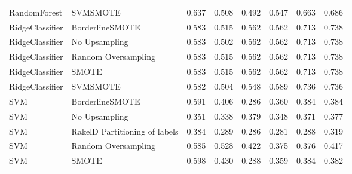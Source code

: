 \begin{tabular}{llllllll}
                   RandomForest &                      SVMSMOTE & 0.637 &                     0.508 &                 0.492 &                  0.547 &                                   0.663 &     0.686 \\
                RidgeClassifier &               BorderlineSMOTE & 0.583 &                     0.515 &                 0.562 &                  0.562 &                                   0.713 &     0.738 \\
                RidgeClassifier &                 No Upsampling & 0.583 &                     0.502 &                 0.562 &                  0.562 &                                   0.713 &     0.738 \\
                RidgeClassifier &           Random Oversampling & 0.583 &                     0.515 &                 0.562 &                  0.562 &                                   0.713 &     0.738 \\
                RidgeClassifier &                         SMOTE & 0.583 &                     0.515 &                 0.562 &                  0.562 &                                   0.713 &     0.738 \\
                RidgeClassifier &                      SVMSMOTE & 0.582 &                     0.504 &                 0.548 &                  0.589 &                                   0.736 &     0.736 \\
                            SVM &               BorderlineSMOTE & 0.591 &                     0.406 &                 0.286 &                  0.360 &                                   0.384 &     0.384 \\
                            SVM &                 No Upsampling & 0.351 &                     0.338 &                 0.379 &                  0.348 &                                   0.371 &     0.377 \\
                            SVM & RakelD Partitioning of labels & 0.384 &                     0.289 &                 0.286 &                  0.281 &                                   0.288 &     0.319 \\
                            SVM &           Random Oversampling & 0.585 &                     0.528 &                 0.422 &                  0.375 &                                   0.376 &     0.417 \\
                            SVM &                         SMOTE & 0.598 &                     0.430 &                 0.288 &                  0.359 &                                   0.384 &     0.382 \\

\end{tabular}

